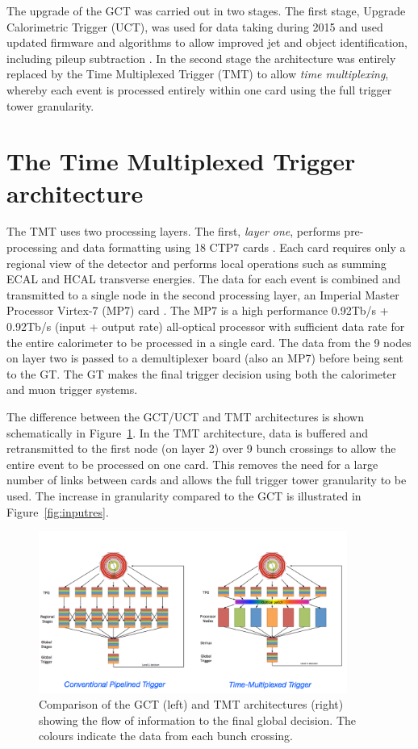 The upgrade of the GCT was carried out in two stages. The first stage,
Upgrade Calorimetric Trigger (UCT), was used for data taking during 2015
and used updated firmware and algorithms to allow improved jet and object 
identification, including pileup subtraction \cite{uct}. In the second stage the 
architecture was entirely replaced by the Time Multiplexed Trigger (TMT) 
to allow \emph{time multiplexing}, whereby each
event is processed entirely within one card using the full trigger tower granularity. 

\section{The Time Multiplexed Trigger architecture}

The TMT uses two processing layers. The first, \emph{layer one}, performs
pre-processing and data formatting using 18 CTP7 cards \cite{mp7}. Each card requires
only a regional view of the detector and performs local operations such as summing 
ECAL and HCAL transverse energies. The data for each event is combined and transmitted to 
a single node in the second processing layer, an Imperial Master Processor Virtex-7 (MP7) card \cite{mp7}. 
The MP7 is a high performance 0.92Tb/s + 0.92Tb/s (input + output rate) all-optical processor 
with sufficient data rate for the entire calorimeter to be processed in a single card. The data 
from the 9 nodes on layer two is passed to a demultiplexer board (also an MP7) before
being sent to the GT. The GT makes the final trigger decision using both the calorimeter
and muon trigger systems.

The difference between the GCT/UCT and TMT architectures is shown schematically in Figure~\ref{tmux}. 
In the TMT architecture, data is buffered and retransmitted to the first node (on layer 2)
over 9 bunch crossings to allow the entire event to be processed on one card. This
removes the need for a large number of links between cards and allows the full trigger
tower granularity to be used. The increase in granularity compared to the GCT is
illustrated in Figure~\ref{fig:inputres}. 

\begin{figure}

\centering
    \includegraphics[width=0.9\textwidth]{./Figures/triggerUpgrade/tmux}
  \caption{Comparison of the GCT (left) and TMT architectures (right) showing the flow of information
  to the final global decision. The colours indicate the data from each bunch crossing. \cite{tmt}}
  \label{tmux}
\end{figure}

